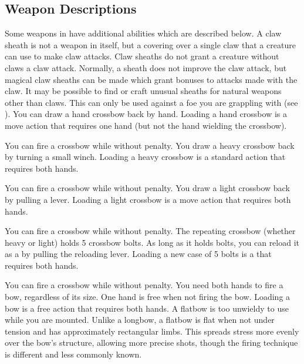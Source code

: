     \subsection{Weapon Descriptions}
        Some weapons in  have additional abilities which are described below.
         A claw sheath is not a weapon in itself, but a covering over a single claw that a creature can use to make claw attacks. Claw sheaths do not grant a creature without claws a claw attack. Normally, a sheath does not improve the claw attack, but magical claw sheaths can be made which grant bonuses to attacks made with the claw. It may be possible to find or craft unusual sheaths for natural weapons other than claws.
         This  can only be used against a foe you are grappling with (see ).
         You can draw a hand crossbow back by hand. Loading a hand crossbow is a move action that requires one hand (but not the hand wielding the crossbow).
        \par You can fire a crossbow while \prone without penalty.
         You draw a heavy crossbow back by turning a small winch. Loading a heavy crossbow is a standard action that requires both hands.
        \par You can fire a crossbow while \prone without penalty.
         You draw a light crossbow back by pulling a lever. Loading a light crossbow is a move action that requires both hands.
        \par You can fire a crossbow while \prone without penalty.
         The repeating crossbow (whether heavy or light) holds 5 crossbow bolts. As long as it holds bolts, you can reload it as a  by pulling the reloading lever. Loading a new case of 5 bolts is a  that requires both hands.
        \par You can fire a crossbow while \prone without penalty.
         You need both hands to fire a bow, regardless of its size. One hand is free when not firing the bow. Loading a bow is a free action that requires both hands. A flatbow is too unwieldy to use while you are mounted.
        Unlike a longbow, a flatbow is flat when not under tension and has approximately rectangular limbs.
        This spreads stress more evenly over the bow's structure, allowing more precise shots, though the firing technique is different and less commonly known.
